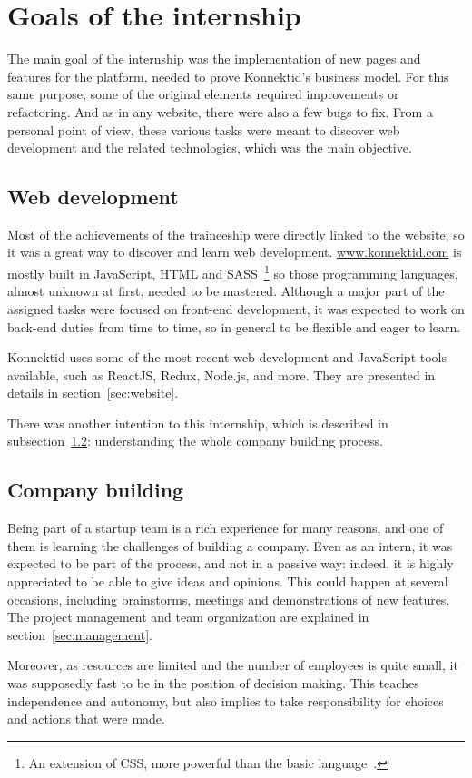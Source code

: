 \section{Goals of the internship}
\label{sec:goals}

The main goal of the internship was the implementation of new pages and features for the platform, needed to prove Konnektid's business model.
For this same purpose, some of the original elements required improvements or refactoring. And as in any website, there were also a few bugs to fix.
From a personal point of view, these various tasks were meant to discover web development and the related technologies, which was the main objective.

\subsection{Web development}
\label{ssec:web}

Most of the achievements of the traineeship were directly linked to the website, so it was a great way to discover and learn web development.
\url{www.konnektid.com} is mostly built in JavaScript, HTML and SASS~\footnote{An extension of CSS, more powerful than the basic language~\cite{sass}.}
so those programming languages, almost unknown at first, needed to be mastered.
Although a major part of the assigned tasks were focused on front-end development,
it was expected to work on back-end duties from time to time, so in general to be flexible and eager to learn.

Konnektid uses some of the most recent web development and JavaScript tools available, such as ReactJS, Redux, Node.js, and more.
They are presented in details in {\sc section}~\ref{sec:website}.

There was another intention to this internship, which is described in {\sc subsection}~\ref{ssec:companyBuilding}:
understanding the whole company building process.

\subsection{Company building}
\label{ssec:companyBuilding}

Being part of a startup team is a rich experience for many reasons, and one of them is learning the challenges of building a company.
Even as an intern, it was expected to be part of the process, and not in a passive way:
indeed, it is highly appreciated to be able to give ideas and opinions.
This could happen at several occasions, including brainstorms, meetings and demonstrations of new features.
The project management and team organization are explained in {\sc section}~\ref{sec:management}.

Moreover, as resources are limited and the number of employees is quite small, it was supposedly fast to be in the position of decision making.
This teaches independence and autonomy, but also implies to take responsibility for choices and actions that were made.

